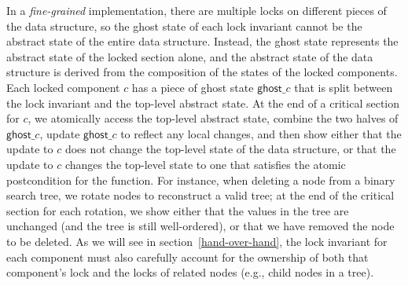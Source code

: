 \documentclass[runningheads]{llncs}
\newcommand{\islock}{\boxdotright}
\newcommand{\lockvar}{\islock^{v}}
\newcommand{\myhalf}[2]{\ensuremath{\mathsf{node\_ghost}^{.5}_{#1}\ (#2)}}
\newcommand{\publichalf}[2]{\ensuremath{\mathsf{node\_ghost}^{.5}_{#1}\ (#2)}}
\newcommand{\ignore}[1]{}
\begin{document}
\label{atomicity}

In a \emph{fine-grained} implementation, there are multiple locks on different pieces of the data structure, so the ghost state of each lock invariant cannot be the abstract state of the entire data structure. Instead, the ghost state represents the abstract state of the locked section alone, and the abstract state of the data structure is derived from the composition of the states of the locked components. Each locked component $c$ has a piece of ghost state $\mathsf{ghost}\_c$ that is split between the lock invariant and the top-level abstract state. At the end of a critical section for $c$, we atomically access the top-level abstract state, combine the two halves of $\mathsf{ghost}\_c$, update $\mathsf{ghost}\_c$ to reflect any local changes, and then show either that the update to $c$ does not change the top-level state of the data structure, or that the update to $c$ changes the top-level state to one that satisfies the atomic postcondition for the function. For instance, when deleting a node from a binary search tree, we rotate nodes to reconstruct a valid tree; at the end of the critical section for each rotation, we show either that the values in the tree are unchanged (and the tree is still well-ordered), or that we have removed the node to be deleted. %
As we will see in section~\ref{hand-over-hand}, the lock invariant for each component must also carefully account for the ownership of both that component's lock and the locks of related nodes (e.g., child nodes in a tree).

\ignore{The construction of the lock variants is simple. We begin with a \emph{part-reference} ghost state, a common construction for sharing information between an invariant and the threads that act on it, with elements $\publichalf{a}$ (the current state $a$) and $\myhalf{\pi}{p}$ (partial information about the current state, annotated with a share $\pi$). When the share $\pi$ is 1, we know that $p = a$. (do we want to define this ourselves, or reference it somewhere? note also that this is what Iris calls an authoritative algebra) A lock variant with an assertion $R(a)$ is then defined as %
$$\ell \lockvar_\pi R \triangleq \ell \islock \exists a.\ R(a) * \myhalf{\pi}{a}$$ %
The share $\pi$ may be set to 1 if the lock's information about $a$ is always fully up to date, or a smaller share if it can become outdated due to operations on other parts of the data structure. Since $a$ is existentially quantified, a thread that changes the value of $a$ forgets it after releasing the lock (as required in a lock invariant), but it must have synchronized with a $\publichalf{a}$ held elsewhere (usually in a global invariant) that will remember the change. Thus, the ghost state acts as a bridge between the component lock invariant and the global abstract state of the data structure. %
}
\end{document}
